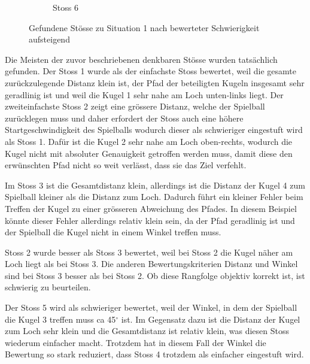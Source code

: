 \begin{figure}
\begin{subfigure}[b]{0.3\textwidth}
        \caption{Stoss 6}
        \label{fig:situation_1_solution_6}
    \end{subfigure}
    \caption{Gefundene Stösse zu Situation 1 nach bewerteter Schwierigkeit aufsteigend}
    \label{fig:situation_1_solutions}
\end{figure}

Die Meisten der zuvor beschriebenen denkbaren Stösse wurden tatsächlich gefunden.
Der Stoss 1 wurde als der einfachste Stoss bewertet, weil die gesamte zurückzulegende Distanz klein ist,
der Pfad der beteiligten Kugeln insgesamt sehr geradlinig ist und weil die Kugel 1 sehr nahe am Loch unten-links liegt.
Der zweiteinfachste Stoss 2 zeigt eine grössere Distanz, welche der Spielball zurücklegen muss und daher erfordert
der Stoss auch eine höhere Startgeschwindigkeit des Spielballs wodurch dieser als schwieriger eingestuft wird als Stoss 1.
Dafür ist die Kugel 2 sehr nahe am Loch oben-rechts, wodurch die Kugel nicht mit absoluter Genauigkeit getroffen werden
muss, damit diese den erwünschten Pfad nicht so weit verlässt, dass sie das Ziel verfehlt.

Im Stoss 3 ist die Gesamtdistanz klein, allerdings ist die Distanz der Kugel 4 zum Spielball kleiner als die Distanz zum Loch.
Dadurch führt ein kleiner Fehler beim Treffen der Kugel zu einer grösseren Abweichung des Pfades.
In diesem Beispiel könnte dieser Fehler allerdings relativ klein sein, da der Pfad geradlinig ist und der Spielball die Kugel
nicht in einem Winkel treffen muss.

Stoss 2 wurde besser als Stoss 3 bewertet, weil bei Stoss 2 die Kugel näher am Loch liegt als bei Stoss 3. Die anderen
Bewertungskriterien Distanz und Winkel sind bei Stoss 3 besser als bei Stoss 2.
Ob diese Rangfolge objektiv korrekt ist, ist schwierig zu beurteilen.

Der Stoss 5 wird als schwieriger bewertet, weil der Winkel, in dem der Spielball die Kugel 3 treffen muss ca 45$^{\circ}$ ist.
Im Gegensatz dazu ist die Distanz der Kugel zum Loch sehr klein und die Gesamtdistanz ist relativ klein, was diesen Stoss
wiederum einfacher macht. Trotzdem hat in diesem Fall der Winkel die Bewertung so stark reduziert, dass Stoss 4 trotzdem
als einfacher eingestuft wird.

